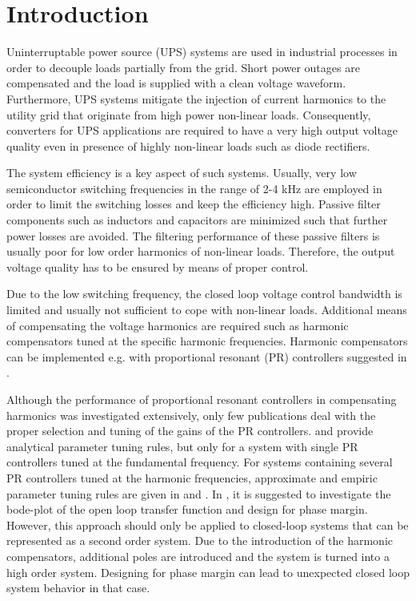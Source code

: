 \documentclass[conference,10pt]{IEEEtran}
\begin{document}
\IEEEpeerreviewmaketitle


\section{Introduction}

Uninterruptable power source (UPS) systems are used in industrial processes in order to decouple loads partially from the grid. Short power outages are compensated and the load is supplied with a clean voltage waveform. Furthermore, UPS systems mitigate the injection of current harmonics to the utility grid that originate from high power non-linear loads.  Consequently, converters for UPS applications are required to have a very high output voltage quality even in presence of highly non-linear loads such as diode rectifiers.

The system efficiency is a key aspect of such systems. Usually, very low semiconductor switching frequencies in the range of 2-4 kHz are employed in order to limit the switching losses and keep the efficiency high. Passive filter components such as inductors and capacitors are minimized such that further power losses are avoided. The filtering performance of these passive filters is usually poor for low order harmonics of non-linear loads. Therefore, the output voltage quality has to be ensured by means of proper control.

Due to the low switching frequency, the closed loop voltage control bandwidth is limited and usually not sufficient to cope with non-linear loads. Additional means of compensating the voltage harmonics are required such as harmonic compensators tuned at the specific harmonic frequencies. Harmonic compensators can be implemented e.g. with proportional resonant (PR) controllers suggested in \cite{924769,4270758,6408064,6153368,993175,5398914,989372}.

Although the performance of proportional resonant controllers in compensating harmonics was investigated extensively, only few publications deal with the proper selection and tuning of the gains of the PR controllers. \cite{5338054} and \cite{6870109} provide analytical parameter tuning rules, but only for a system with single PR controllers tuned at the fundamental frequency. For systems containing several PR controllers tuned at the harmonic frequencies, approximate and empiric parameter tuning rules are given in \cite{924769} and \cite{6153368}. In \cite{5398914}, it is suggested to investigate the bode-plot of the open loop transfer function and design for phase margin. However, this approach should only be applied to closed-loop systems that can be represented as a second order system. Due to the introduction of the harmonic compensators, additional poles are introduced and the system is turned into a high order system. Designing for phase margin can lead to unexpected closed loop system behavior in that case.
\end{document}

